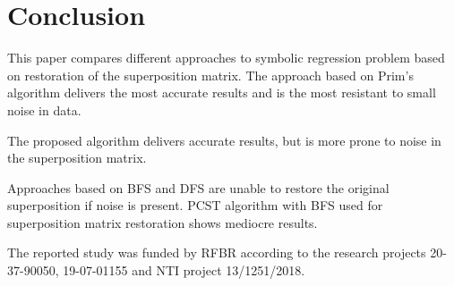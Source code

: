 \documentclass[11pt, tightenlines, twoside, onecolumn, nofloats, nobibnotes, nofootinbib, superscriptaddress, noshowpacks, centertags]{revtex4}
\begin{document}
\section{Conclusion}

This paper compares different approaches to symbolic regression problem based on restoration of the superposition matrix. The approach based on Prim's algorithm delivers the most accurate results and is the most resistant to small noise in data. 

The proposed algorithm delivers accurate results, but is more prone to noise in the superposition matrix.

Approaches based on BFS and DFS are unable to restore the original superposition if noise is present. PCST algorithm with BFS used for superposition matrix restoration shows mediocre results.

\begin{acknowledgments}
The reported study was funded by RFBR according to the research projects 20-37-90050, 19-07-01155 and NTI project 13/1251/2018.
\end{acknowledgments}

%
%
\end{document}
